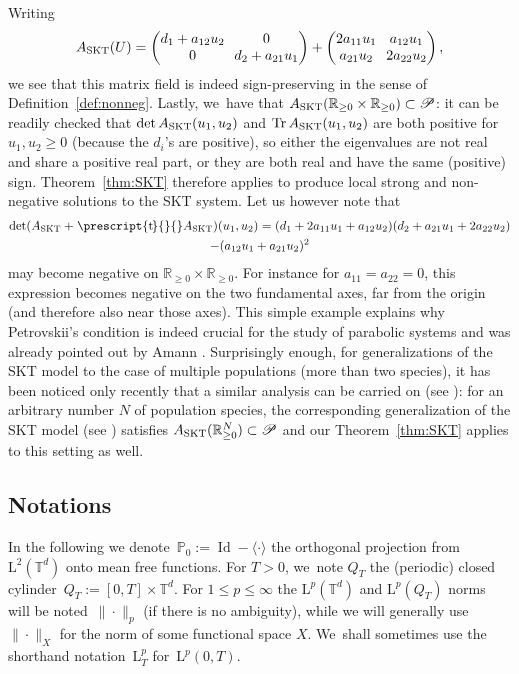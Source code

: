 \documentclass[10pt]{amsart}
\DeclareMathOperator{\Tr}{Tr}
\newcommand{\SKT}{\textup{SKT}}
\theoremstyle{definition}
\newcommand\R{\mathbb{R}}
\newcommand\T{\mathbb{T}}
\renewcommand\L{\mathrm{L}}
\DeclareMathOperator\Id{Id}
\newcommand*{\transp}[2][-2mu]{\ensuremath{\mskip1mu\prescript{\smash{\mathrm t\mkern#1}}{}{\mathstrut#2}}}%
\begin{document}
Writing
\[\arraycolsep3.5pt
A_{\SKT}(U)=
\begin{pmatrix} d_1+a_{12}u_2 & 0\\
0 & d_2+ a_{21}u_1
\end{pmatrix} +\begin{pmatrix} 2a_{11}u_1 & a_{12}u_1\\
a_{21}u_2 & 2 a_{22}u_2
\end{pmatrix},
\]
we see that this matrix field is indeed sign-preserving in the sense of Definition~\ref{def:nonneg}. Lastly, we~have that $A_{\SKT}(\R_{\geq 0}\times\R_{\geq 0})\subset\mathscr{P}$: it can be readily checked that $\det A_{\SKT}(u_1,u_2)$ and $\Tr A_{\SKT}(u_1,u_2)$ are both positive for $u_1,u_2\geq 0$ (because the $d_i$'s are positive), so either the eigenvalues are not real and share a positive real part, or they are both real and have the same (positive) sign. Theorem~\ref{thm:SKT} therefore applies to produce local strong and non-negative solutions to the SKT system.
Let us however note that
\begin{multline*}
\det(A_{\SKT}+\transp{}A_{\SKT})(u_1,u_2) = (d_1+2a_{11}u_1+a_{12}u_2)(d_2+a_{21}u_1+2a_{22}u_2)\\
-(a_{12} u_1+a_{21}u_2)^2
\end{multline*}
may become negative on $\R_{\geq 0}\times \R_{\geq 0}$. For instance for $a_{11}=a_{22}=0$, this expression becomes negative on the two fundamental axes, far from the origin (and therefore also near those axes). This simple example explains why Petrovskii's condition is indeed crucial for the study of parabolic systems and was already pointed out by Amann \cite{amann}. {Surprisingly enough, for generalizations of the SKT model to the case of multiple populations (more than two species), it has been noticed only recently that a similar analysis can be carried on (see \cite[\S 7]{chenjun2021}): for an arbitrary number $N$ of population species, the corresponding generalization of the SKT model (see \cite{chenjun2021}) satisfies $A_{\SKT}(\R_{\geq 0}^N)\subset\mathscr{P}$ and our Theorem~\ref{thm:SKT} applies to this setting as well.}

\subsection{Notations}\label{subsec:not}
In the following we denote~${\mathbb P}_0:= \Id-\langle \cdot\rangle$ the orthogonal projection from~$\L^2(\T^d)$ onto mean free functions. For $T>0$, we~note $Q_T$ the (periodic) closed cylinder~$Q_T:=[0,T]\times\T^d$. For $1\leq p \leq \infty$ the $\L^p(\T^d)$ and $\L^p(Q_T)$ norms will be noted~$\|{\cdot}\|_p$ (if there is no ambiguity), while we will generally use $\|{\cdot}\|_X$ for the norm of some functional space $X$. We~shall sometimes use the shorthand notation~$\L^p_T$ for~$\L^p(0,T)$.
\end{document}
